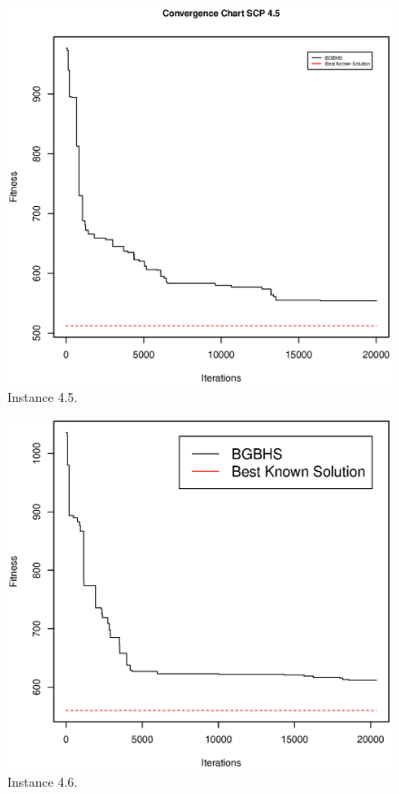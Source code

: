 \begin{figure}[]
\centering
\includegraphics[scale=.45]{Resultados/scp45.eps}
\caption{Instance 4.5.}
\label{fig:Instance.4.5}
\end{figure}

\begin{figure}[]
\centering
\includegraphics[scale=.45]{Resultados/scp46.eps}
\caption{Instance 4.6.}
\label{fig:Instance.4.6}
\end{figure}

